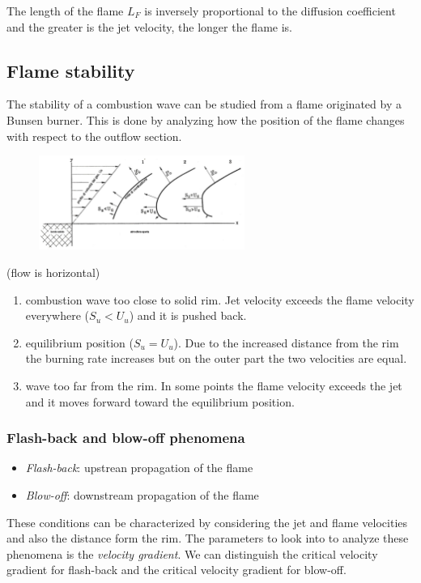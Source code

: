 \documentclass[12pt]{article}
\begin{document}
The length of the flame $L_{F}$ is inversely proportional to the diffusion coefficient and the greater is the jet velocity, the longer the flame is.

\subsection{Flame stability}

The stability of a combustion wave can be studied from a flame originated by a Bunsen burner. This is done by analyzing how the position of the flame changes with respect to the outflow section.

\begin{figure}[!ht]
\centering
\includegraphics[width=0.6\textwidth]{figures/stability2.png}
\end{figure}

(flow is horizontal)
\begin{enumerate}
    \item combustion wave too close to solid rim. Jet velocity exceeds the flame velocity everywhere ($S_{u}<U_{u}$) and it is pushed back.
    \item equilibrium position ($S_{u}=U_{u}$). Due to the increased distance from the rim the burning rate increases but on the outer part the two velocities are equal.
    \item wave too far from the rim. In some points the flame velocity exceeds the jet and it moves forward toward the equilibrium position.
\end{enumerate}

\subsubsection{Flash-back and blow-off phenomena}

\begin{itemize}
    \item \textit{Flash-back}: upstrean propagation of the flame
    \item \textit{Blow-off}: downstream propagation of the flame
\end{itemize}
These conditions can be characterized by considering the jet and flame velocities and also the distance form the rim.
The parameters to look into to analyze these phenomena is the \textit{velocity gradient}.
We can distinguish the critical velocity gradient for flash-back and the critical velocity gradient for blow-off.
\end{document}
